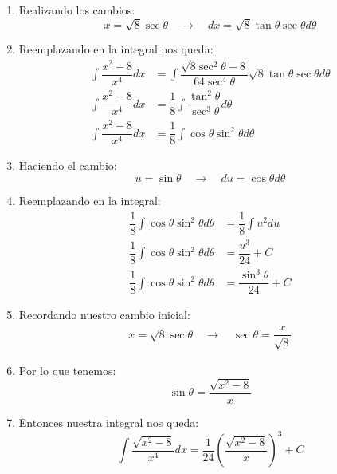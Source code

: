 \documentclass[../main]{subfiles}
\begin{document}
\begin{itemize}
\begin{enumerate}
            \item Realizando los cambios:
                \begin{equation*}
                    x= \sqrt{8} \sec{\theta} \quad \rightarrow \quad dx=\sqrt{8} \tan{\theta} \sec{\theta}d\theta
                \end{equation*}
            \item Reemplazando en la integral nos queda:
                \begin{align*}
                    \int \dfrac{x^2-8}{x^4}dx&= \int \dfrac{\sqrt{8 \sec^2{\theta}-8}}{64\sec^4{\theta}} \sqrt{8} \tan{\theta} \sec{\theta} d\theta \\
                    \int \dfrac{x^2-8}{x^4}dx&= \dfrac{1}{8} \int \dfrac{\tan^2{\theta}}{\sec^3{\theta}}d\theta \\
                    \int \dfrac{x^2-8}{x^4}dx&= \dfrac{1}{8} \int \cos{\theta} \sin^2{\theta}d\theta
                \end{align*}
            \item Haciendo el cambio:
                \begin{equation*}
                    u=\sin{\theta} \quad \rightarrow \quad du=\cos{\theta}d\theta
                \end{equation*}
            \item Reemplazando en la integral:
                \begin{align*}
                    \dfrac{1}{8} \int \cos{\theta} \sin^2{\theta}d\theta&=\dfrac{1}{8} \int u^2 du \\
                    \dfrac{1}{8} \int \cos{\theta} \sin^2{\theta}d\theta&=\dfrac{u^3}{24}+C \\
                    \dfrac{1}{8} \int \cos{\theta} \sin^2{\theta}d\theta&= \dfrac{\sin^3{\theta}}{24}+C
                \end{align*}
            \item Recordando nuestro cambio inicial:
                \begin{align*}
                    x= \sqrt{8} \sec{\theta} \quad \rightarrow \quad \sec{\theta}=\dfrac{x}{\sqrt{8}}
                \end{align*}
            \item Por lo que tenemos:
                \begin{equation*}
                \sin{\theta}=\dfrac{\sqrt{x^2-8}}{x}
                \end{equation*}
            \item Entonces nuestra integral nos queda:
                \begin{equation*}
                    \int \dfrac{\sqrt{x^2-8}}{x^4}dx=\dfrac{1}{24}\left( \dfrac{\sqrt{x^2-8}}{x} \right)^3+C
                \end{equation*}
        \end{enumerate}
\end{itemize}
\end{document}
